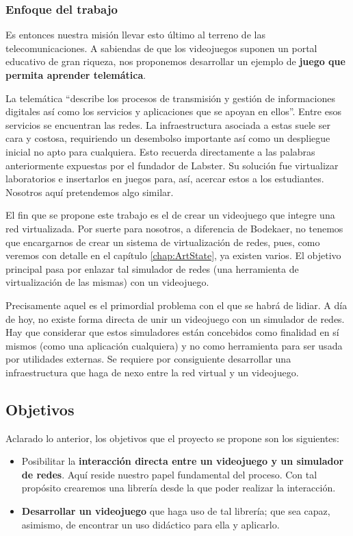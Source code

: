 \subsubsection{Enfoque del trabajo}
Es entonces nuestra misión llevar esto último al terreno de las telecomunicaciones. A sabiendas de que los videojuegos suponen un portal educativo de gran riqueza, nos proponemos desarrollar un ejemplo de \textbf{juego que permita aprender telemática}.

La telemática ``describe los procesos de transmisión y gestión de informaciones digitales así como los servicios y aplicaciones que se apoyan en ellos''\cite{telematica}. Entre esos servicios se encuentran las redes. La infraestructura asociada a estas suele ser cara y costosa, requiriendo un desembolso importante así como un despliegue inicial no apto para cualquiera. Esto recuerda directamente a las palabras anteriormente expuestas por el fundador de Labster. Su solución fue virtualizar laboratorios e insertarlos en juegos para, así, acercar estos a los estudiantes. Nosotros aquí pretendemos algo similar.

El fin que se propone este trabajo es el de crear un videojuego que integre una red virtualizada. Por suerte para nosotros, a diferencia de Bodekaer, no tenemos que encargarnos de crear un sistema de virtualización de redes, pues, como veremos con detalle en el capítulo \ref{chap:ArtState}, ya existen varios. El objetivo principal pasa por enlazar tal simulador de redes (una herramienta de virtualización de las mismas) con un videojuego.

Precisamente aquel es el primordial problema con el que se habrá de lidiar. A día de hoy, no existe forma directa de unir un videojuego con un simulador de redes. Hay que considerar que estos simuladores están concebidos como finalidad en sí mismos (como una aplicación cualquiera) y no como herramienta para ser usada por utilidades externas. Se requiere por consiguiente desarrollar una infraestructura que haga de nexo entre la red virtual y un videojuego.
 
\subsection{Objetivos}
Aclarado lo anterior, los objetivos que el proyecto se propone son los siguientes:
\begin{itemize}
\item Posibilitar la \textbf{interacción directa entre un videojuego y un simulador de redes}. Aquí reside nuestro papel fundamental del proceso. Con tal propósito crearemos una librería desde la que poder realizar la interacción.
\item \textbf{Desarrollar un videojuego} que haga uso de tal librería; que sea capaz, asimismo, de encontrar un uso didáctico para ella y aplicarlo.
\end{itemize}

